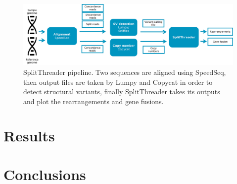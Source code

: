 \documentclass{svproc}
\begin{document}
\begin{figure}[h]
	\centering
	\includegraphics[width=\textwidth]{img/splitthreader/pipeline}
	\caption{SplitThreader pipeline. Two sequences are aligned using SpeedSeq, then output files are taken by Lumpy and Copycat in order to detect structural variants, finally SplitThreader takes its outputs and plot the rearrangements and gene fusions.}
	\label{fig:pipeline}
\end{figure}


\section{Results} 

\section{Conclusions} \label{section:conclusions}	





\end{document}

